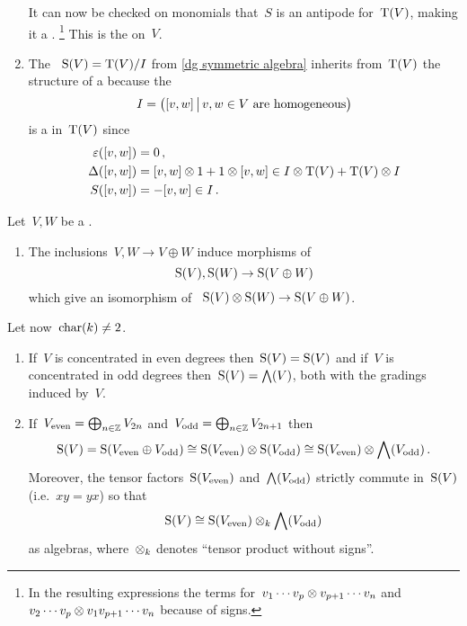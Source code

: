 \documentclass[a4paper,10pt,headings=standardclasses]{scrartcl}
\begin{document}
\begin{example}
\begin{enumerate}
\[      \]%
      It can now be checked on monomials that~$S$ is an antipode for~$\operatorname{T}(V)$, making it a {\dgh}.%
      \footnote{In the resulting expressions the terms for~$v_1 \dotsm v_p \otimes v_{p+1} \dotsm v_n$ and~$v_2 \dotsm v_p \otimes v_1 v_{p+1} \dotsm v_n$ because of signs.}
      This is the  on~$V$.
    \item
      The {\dga}~$\operatorname{S}(V) = \operatorname{T}(V)/I$ from \cref{dg symmetric algebra} inherits from~$\operatorname{T}(V)$ the structure of a {\dgh} because the~{\dgi}
      \[
        I
        =
        \bigl(
          [v,w]
        \suchthat[\big]
          \text{$v,w \in V$ are homogeneous}
        \bigr)
      \]
      is a {\dghi} in~$\operatorname{T}(V)$ since
      \begin{align*}
        \varepsilon([v,w])
        &=
        0 \,,
      \\
        \Delta([v,w])
        &=
        [v,w] \otimes 1 + 1 \otimes [v,w]
        \in
        I \otimes \operatorname{T}(V) + \operatorname{T}(V) \otimes I
      \\
        S([v,w])
        &=
        -[v,w]
        \in
        I \,.
      \end{align*}
  \end{enumerate}
\end{example}

\begin{remark}
  Let~$V, W$ be a {\dgv}.
  \begin{enumerate}
    \item
      The inclusions~$V, W \to V \oplus W$ induce morphisms of {\dghs}
      \[
        \operatorname{S}(V), \operatorname{S}(W)
        \to
        \operatorname{S}(V \oplus W)
      \]
      which give an isomorphism of {\dghs}~$\operatorname{S}(V) \otimes \operatorname{S}(W) \to \operatorname{S}(V \oplus W)$.
  \end{enumerate}
  Let now~$\operatorname{char}(k) \neq 2$.
  \begin{enumerate}[resume]
    \item
      If~$V$ is concentrated in even degrees then~$\operatorname{S}(V) = \operatorname{S}(V)$ and if~$V$ is concentrated in odd degrees then~$\operatorname{S}(V) = \bigwedge(V)$, both with the gradings induced by~$V$.
    \item
      If~$V_{\text{even}} = \bigoplus_{n \in \mathbb{Z}} V_{2n}$ and~$V_{\text{odd}} = \bigoplus_{n \in \mathbb{Z}} V_{2n+1}$ then
      \[
        \operatorname{S}(V)
        =
        \operatorname{S}(V_{\text{even}} \oplus V_{\text{odd}})
        \cong
        \operatorname{S}(V_{\text{even}}) \otimes \operatorname{S}(V_{\text{odd}})
        \cong
        \operatorname{S}(V_{\text{even}}) \otimes \bigwedge(V_{\text{odd}}) \,.
      \]
      Moreover, the tensor factors~$\operatorname{S}(V_{\text{even}})$ and~$\bigwedge(V_{\text{odd}})$ strictly commute in~$\operatorname{S}(V)$ (i.e.~$xy = yx$) so that
      \[
        \operatorname{S}(V)
        \cong
        \operatorname{S}(V_{\text{even}}) \otimes_k \bigwedge(V_{\text{odd}})
      \]
      as algebras, where~$\otimes_k$ denotes \enquote{tensor product without signs}.
  \end{enumerate}
\end{remark}
\end{document}

